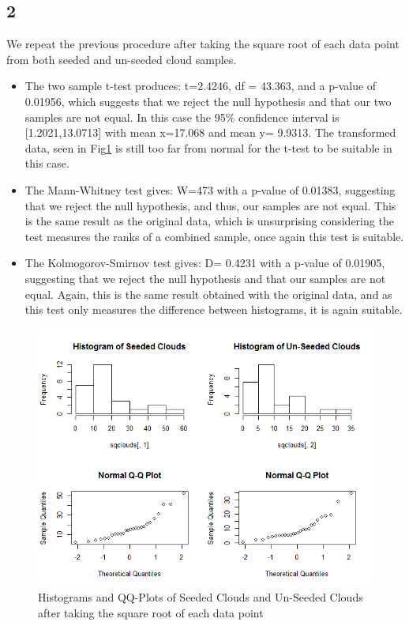 \documentclass{article}
\begin{document}
    \subsection*{2}
    We repeat the previous procedure after taking the square root of each data point from both seeded and un-seeded cloud samples.
    \begin{itemize}
    \item The two sample t-test produces: t=2.4246, df = 43.363, and a p-value of 0.01956, which suggests that we reject the null hypothesis and that our two samples are not equal. In this case the 95\% confidence interval is [1.2021,13.0713] with mean x=17.068 and mean y= 9.9313. The transformed data, seen in Fig\ref{fig:sq(clouds)} is still too far from normal for the t-test to be suitable in this case.
    \item The Mann-Whitney test gives: W=473 with a p-value of 0.01383, suggesting that we reject the null hypothesis, and thus, our samples are not equal. This is the same result as the original data, which is unsurprising considering the test measures the ranks of a combined sample, once again this test is suitable.
    \item The Kolmogorov-Smirnov test gives: D= 0.4231 with a p-value of 0.01905, suggesting that we reject the null hypothesis and that our samples are not equal. Again, this is the same result obtained with the original data, and as this test only measures the difference between histograms, it is again suitable.
    \end{itemize}
    
    \begin{figure}[H]
      \includegraphics[scale=0.5]{../results/2_2.png}
      \caption{Histograms and QQ-Plots of Seeded Clouds and Un-Seeded Clouds after taking the square root of each data point}
      \label{fig:sq(clouds)}
    \end{figure}
    
\end{document}
